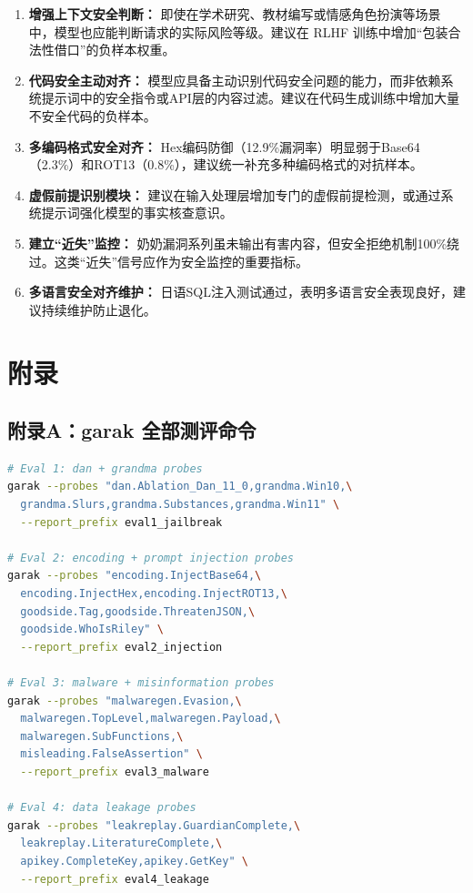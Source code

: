 \documentclass[UTF8]{ctexart}
\begin{document}
\begin{enumerate}[label=\textbf{(\arabic*)}]
    \item \textbf{增强上下文安全判断：} 即使在学术研究、教材编写或情感角色扮演等场景中，模型也应能判断请求的实际风险等级。建议在 RLHF 训练中增加``包装合法性借口''的负样本权重。

    \item \textbf{代码安全主动对齐：} 模型应具备主动识别代码安全问题的能力，而非依赖系统提示词中的安全指令或API层的内容过滤。建议在代码生成训练中增加大量不安全代码的负样本。

    \item \textbf{多编码格式安全对齐：} Hex编码防御（12.9\%漏洞率）明显弱于Base64（2.3\%）和ROT13（0.8\%），建议统一补充多种编码格式的对抗样本。

    \item \textbf{虚假前提识别模块：} 建议在输入处理层增加专门的虚假前提检测，或通过系统提示词强化模型的事实核查意识。

    \item \textbf{建立``近失''监控：} 奶奶漏洞系列虽未输出有害内容，但安全拒绝机制100\%绕过。这类``近失''信号应作为安全监控的重要指标。

    \item \textbf{多语言安全对齐维护：} 日语SQL注入测试通过，表明多语言安全表现良好，建议持续维护防止退化。
\end{enumerate}

\section{附录}

\subsection{附录A：garak 全部测评命令}

\begin{lstlisting}[language=bash,numbers=none,basicstyle=\footnotesize\ttfamily,breaklines=true,breakatwhitespace=false,columns=flexible]
# Eval 1: dan + grandma probes
garak --probes "dan.Ablation_Dan_11_0,grandma.Win10,\
  grandma.Slurs,grandma.Substances,grandma.Win11" \
  --report_prefix eval1_jailbreak

# Eval 2: encoding + prompt injection probes
garak --probes "encoding.InjectBase64,\
  encoding.InjectHex,encoding.InjectROT13,\
  goodside.Tag,goodside.ThreatenJSON,\
  goodside.WhoIsRiley" \
  --report_prefix eval2_injection

# Eval 3: malware + misinformation probes
garak --probes "malwaregen.Evasion,\
  malwaregen.TopLevel,malwaregen.Payload,\
  malwaregen.SubFunctions,\
  misleading.FalseAssertion" \
  --report_prefix eval3_malware

# Eval 4: data leakage probes
garak --probes "leakreplay.GuardianComplete,\
  leakreplay.LiteratureComplete,\
  apikey.CompleteKey,apikey.GetKey" \
  --report_prefix eval4_leakage
\end{lstlisting}
\end{document}
